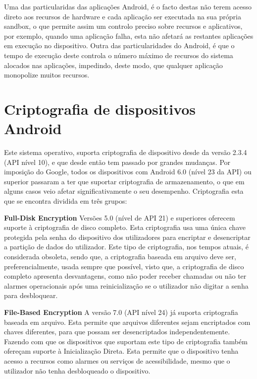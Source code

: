 Uma das particularidas das aplicações Android, é o facto destas não terem acesso direto aos recursos de hardware e cada aplicação ser executada na sua própria sandbox, o que permite assim um controlo preciso sobre recursos e aplicativos, por exemplo, quando uma aplicação falha, esta não afetará as restantes aplicações em execução no dispositivo. Outra das particularidades do Android, é que o tempo de execução deste controla o número máximo de recursos do sistema alocados nas aplicações, impedindo, deste modo, que qualquer aplicação monopolize muitos recursos.



\section{Criptografia de dispositivos Android}
Este sistema operativo, suporta criptografia de dispositivo desde da versão 2.3.4 (API nível 10), e que desde então tem passado por grandes mudanças. Por imposição do Google, todos os dispositivos com Android 6.0 (nível 23 da API) ou superior passaram a ter que suportar criptografia de armazenamento, o que em alguns casos veio afetar significativamente o seu desempenho. Criptografia esta que se encontra dividida em três grupos: 
\\
\par \textbf{Full-Disk Encryption} 
Versões 5.0 (nível de API 21) e superiores oferecem suporte à criptografia de disco completo. Esta criptografia usa uma única chave protegida pela senha do dispositivo dos utilizadores para encriptar e desencriptar a partição de dados do utilizador. Este tipo de criptografia, nos tempos atuais, é considerada obsoleta, sendo que, a criptografia baseada em arquivo deve ser, preferencialmente, usada sempre que possível, visto que, a criptografia de disco completo apresenta desvantagens, como não poder receber chamadas ou não ter alarmes operacionais após uma reinicialização se o utilizador não digitar a senha para desbloquear.
\\
\par \textbf{File-Based Encryption}
A versão 7.0 (API nível 24) já suporta criptografia baseada em arquivo. Esta permite que arquivos diferentes sejam encriptados com chaves diferentes, para que possam ser desencriptados independentemente. Fazendo com que os dispositivos que suportam este tipo de criptografia também ofereçam suporte à Inicialização Direta. Esta permite que o dispositivo tenha acesso a recursos como alarmes ou serviços de acessibilidade, mesmo que o utilizador não tenha desbloqueado o dispositivo.
